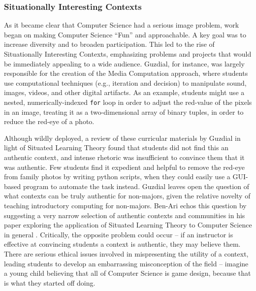 \subsubsection{Situationally Interesting Contexts}

As it became clear that Computer Science had a serious image problem, work began on making Computer Science ``Fun'' and approachable. 
A key goal was to increase diversity and to broaden participation. 
This led to the rise of Situationally Interesting Contexts, emphasizing problems and projects that would be immediately appealing to a wide audience.
Guzdial, for instance, was largely responsible for the creation of the Media Computation approach, where students use computational techniques (e.g., iteration and decision) to manipulate sound, images, videos, and other digital artifacts.
As an example, students might use a nested, numerically-indexed \texttt{for} loop in order to adjust the red-value of the pixels in an image, treating it as a two-dimensional array of binary tuples, in order to reduce the red-eye of a photo.

Although wildly deployed, a review of these curricular materials by Guzdial \cite{guzdial2006imagineering} in light of Situated Learning Theory found that students did not find this an authentic context, and intense rhetoric was insufficient to convince them that it was authentic. 
Few students find it expedient and helpful to remove the red-eye from family photos by writing python scripts, when they could easily use a GUI-based program to automate the task instead.
Guzdial leaves open the question of what contexts can be truly authentic for non-majors, given the relative novelty of teaching introductory computing for non-majors.
Ben-Ari echos this question by suggesting a very narrow selection of authentic contexts and communities in his paper exploring the application of Situated Learning Theory to Computer Science in general \cite{ben2004situated}.
Critically, the opposite problem could occur -- if an instructor is effective at convincing students a context is authentic, they may believe them.
There are serious ethical issues involved in mispresenting the utility of a context, leading students to develop an embarrassing misconception of the field -- imagine a young child believing that all of Computer Science is game design, because that is what they started off doing.


